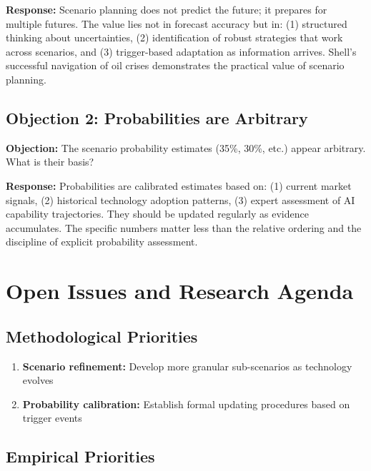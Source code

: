 \textbf{Response:} Scenario planning does not predict the future; it prepares
for multiple futures. The value lies not in forecast accuracy but in:
(1) structured thinking about uncertainties, (2) identification of robust
strategies that work across scenarios, and (3) trigger-based adaptation
as information arrives. Shell's successful navigation of oil crises
demonstrates the practical value of scenario planning.


\subsection{Objection 2: Probabilities are Arbitrary}

\textbf{Objection:} The scenario probability estimates (35\%, 30\%, etc.)
appear arbitrary. What is their basis?

\textbf{Response:} Probabilities are calibrated estimates based on:
(1) current market signals, (2) historical technology adoption patterns,
(3) expert assessment of AI capability trajectories. They should be
updated regularly as evidence accumulates. The specific numbers matter
less than the relative ordering and the discipline of explicit probability
assessment.


\section{Open Issues and Research Agenda}
\label{sec:vvv1-open}

\subsection{Methodological Priorities}

\begin{enumerate}
    \item \textbf{Scenario refinement:} Develop more granular sub-scenarios
        as technology evolves
    \item \textbf{Probability calibration:} Establish formal updating
        procedures based on trigger events
\end{enumerate}

\subsection{Empirical Priorities}

